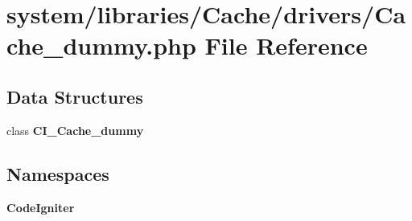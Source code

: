 \section{system/libraries/\-Cache/drivers/\-Cache\-\_\-dummy.php File Reference}
\label{_cache__dummy_8php}
\subsection*{Data Structures}
\begin{DoxyCompactItemize}
\item 
class {\bf C\-I\-\_\-\-Cache\-\_\-dummy}
\end{DoxyCompactItemize}
\subsection*{Namespaces}
\begin{DoxyCompactItemize}
\item 
{\bf Code\-Igniter}
\end{DoxyCompactItemize}
